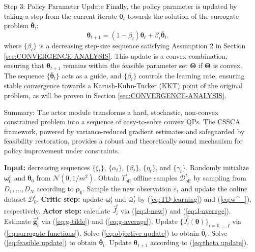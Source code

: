 \documentclass{IEEEtran}
\begin{document}
Step 3: Policy Parameter Update Finally, the policy parameter is updated by taking a step from the current iterate $\boldsymbol{\theta}_{t}$ towards the solution of the surrogate problem $\bar{\boldsymbol{\theta}}_{t}$:
\begin{equation}
\boldsymbol{\theta}_{t+1}=(1-\beta_{t})\boldsymbol{\theta}_{t}+\beta_{t}\bar{\boldsymbol{\theta}}_{t}.\label{eq:theta update}
\end{equation}
where $\{\beta_{t}\}$ is a decreasing step-size sequence satisfying Assumption 2 in Section \ref{sec:CONVERGENCE-ANALYSIS}. This update is a convex combination, ensuring that $\boldsymbol{\theta}_{t+1}$ remains within the feasible parameter set $\boldsymbol{\Theta}$ if $\boldsymbol{\Theta}$ is convex. The sequence $\{\bar{\boldsymbol{\theta}}_{t}\}$ acts as a guide, and $\{\beta_{t}\}$ controls the learning rate, ensuring stable convergence towards a Karush-Kuhn-Tucker (KKT) point of the original problem, as will be proven in Section \ref{sec:CONVERGENCE-ANALYSIS}.

Summary: The actor module transforms a hard, stochastic, non-convex constrained problem into a sequence of easy-to-solve convex QPs. The CSSCA framework, powered by variance-reduced gradient estimates and safeguarded by feasibility restoration, provides a robust and theoretically sound mechanism for policy improvement under constraints.
\begin{algorithm}
\caption{Fused-CPRO Algorithm}\label{alg:the-Single-Loop-Deep}
\begin{algorithmic}[1]
\STATE \textbf{Input:} decreasing sequences $\{\xi_{t}\}$, $\{\alpha_{t}\}$, $\{\beta_{t}\}$, $\{\eta_{t}\}$, and $\{\gamma_{t}\}$.
\STATE Randomly initialize $\boldsymbol{\omega}_{0}^{i}$ and $\boldsymbol{\theta}_{0}$ from $\mathcal{N}(0,1/m^{2})$.
\STATE Obtain $T_{\text{off}}^{t}$ offline samples $\mathcal{D}_{\text{off}}^{t}$ by sampling from $D_{1},\ldots,D_{N}$ according to $\boldsymbol{\rho}_{0}$.
\STATE Sample the new observation $\varepsilon_{t}$ and update the online dataset $\mathcal{D}_{0}^{t}$.
\STATE \textbf{Critic step:} update $\boldsymbol{\omega}_{t}^{i}$ and $\bar{\boldsymbol{\omega}}_{t}^{i}$ by (\ref{eq:TD-learning}) and (\ref{eq:w^_}), respectively.
\STATE \textbf{Actor step:} calculate $\hat{J}_{i}^{t}$ via (\ref{eq:J-new}) and (\ref{eq:J-average}).
\STATE Estimate $\hat{\boldsymbol{g}}_{i}^{t}$ via (\ref{eq:g-tilde}) and (\ref{eq:g-average}).
\STATE Update $\{\bar{J}_{i}^{t}(\boldsymbol{\theta})\}_{i=0,\ldots,I}$ via (\ref{eq:surrogate functions}).
\STATE Solve (\ref{eq:objective update}) to obtain $\bar{\boldsymbol{\theta}}_{t}$.
\ELSE
\STATE Solve (\ref{eq:feasible update}) to obtain $\bar{\boldsymbol{\theta}}_{t}$.
\ENDIF
\STATE Update $\boldsymbol{\theta}_{t+1}$ according to (\ref{eq:theta update}).
\ENDFOR
\end{algorithmic}
\end{algorithm}
\end{document}

